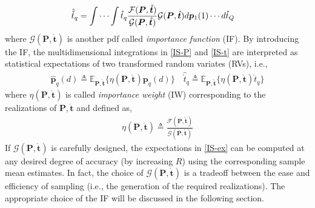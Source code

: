 \documentclass[review]{elsarticle}
\begin{document}
\begin{align}\label{IS-t}    
    \hat{\mathring{t}}_q&=\idotsint \mathring{t}_q \frac{\mathcal{F}(\boldsymbol{P},\mathring{\boldsymbol{t}})}{\mathcal{G}(\boldsymbol{P},\mathring{\boldsymbol{t}})}\mathcal{G}(\boldsymbol{P},\mathring{\boldsymbol{t}})d\boldsymbol{p}_1(1) \cdots d\mathring{t}_Q
\end{align}
where $\mathcal{G}(\boldsymbol{P},\mathring{\boldsymbol{t}})$ is another pdf called \emph{importance function} (IF). By introducing the IF, the multidimensional integrations in \eqref{IS-P} and \eqref{IS-t} are interpreted as statistical expectations of two transformed random variates (RVs), i.e.,
\begin{align}\label{IS-ex}
    \hat{\boldsymbol{p}}_q(d)\triangleq \mathbb{E}_{\boldsymbol{P},\mathring{\boldsymbol{t}}}\{\eta(\boldsymbol{P},\mathring{\boldsymbol{t}})\boldsymbol{p}_q(d)\} \quad \hat{\mathring{t}}_q\triangleq \mathbb{E}_{\boldsymbol{P},\mathring{\boldsymbol{t}}}\{\eta(\boldsymbol{P},\mathring{\boldsymbol{t}})\mathring{t}_q\}
\end{align}
where $\eta(\boldsymbol{P},\mathring{\boldsymbol{t}})$ is called \emph{importance weight} (IW) corresponding to the realizations of $\boldsymbol{P},\mathring{\boldsymbol{t}}$ and defined as,
\begin{align}\label{eta}
    \eta(\boldsymbol{P},\mathring{\boldsymbol{t}})\triangleq\frac{\mathcal{F}(\boldsymbol{P},\mathring{\boldsymbol{t}})}{\mathcal{G}(\boldsymbol{P},\mathring{\boldsymbol{t}})}
\end{align}
If $\mathcal{G}(\boldsymbol{P},\mathring{\boldsymbol{t}})$ is carefully designed, the expectations in \eqref{IS-ex} can be computed at any desired degree of accuracy (by increasing $R$) using the corresponding sample mean estimates. In fact, the choice of $\mathcal{G}(\boldsymbol{P},\mathring{\boldsymbol{t}})$ is a tradeoff between the ease and efficiency of sampling (i.e., the generation of the required realizations). The appropriate choice of the IF will be discussed in the following section. 
\end{document}
